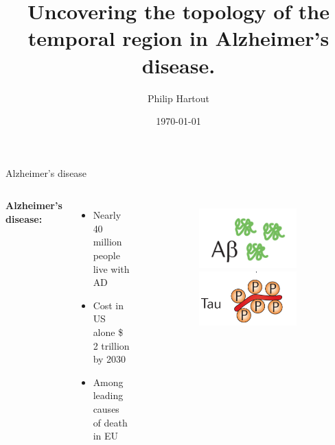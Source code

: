 \documentclass[aspectratio=169, 10pt, dvipsnames]{beamer}
\title{Uncovering the topology of the temporal region in Alzheimer's disease.}
\date{\today}
\author{Philip Hartout}
\begin{document}
\maketitle


\begin{frame}[fragile]{Alzheimer's disease}

  \begin{columns}[T,onlytextwidth]
    \textbf{Alzheimer's disease:} \brain
    \begin{itemize}
    \item Nearly 40 million people live with AD
    \item Cost in US alone \$ 2 trillion by 2030
    \item Among leading causes of death in EU
    \end{itemize}
    \begin{figure}
      \begin{subfigure}{0.2\textwidth}
        \centering
        \includegraphics[width=\textwidth]{figures/misfoldedabeta.png}
        \includegraphics[width=\textwidth]{figures/hypertau.png}

\end{subfigure}
\end{figure}
\end{columns}
\end{frame}
\end{document}
